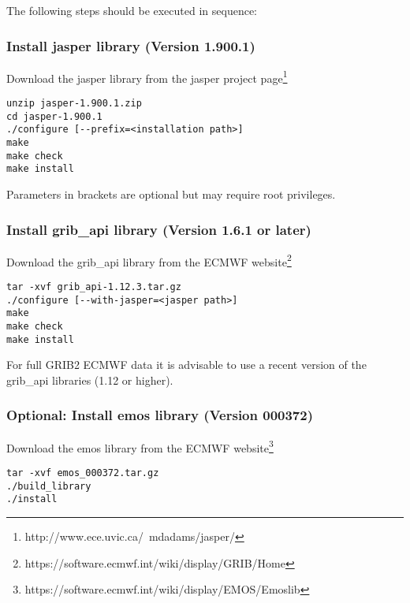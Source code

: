 \documentclass{egu}                  %
\begin{document}
\noindent The following steps should be executed in sequence:

\subsubsection{Install jasper library (Version 1.900.1)}

Download the jasper library from the jasper project page\footnote{http://www.ece.uvic.ca/~mdadams/jasper/} 

\begin{small}
\begin{verbatim}
unzip jasper-1.900.1.zip
cd jasper-1.900.1
./configure [--prefix=<installation path>]
make
make check
make install
\end{verbatim}
\end{small}

Parameters in brackets are optional but may require root privileges.  

\subsubsection{Install grib\_api library (Version 1.6.1 or later)}

Download the grib\_api library from the ECMWF
website\footnote{https://software.ecmwf.int/wiki/display/GRIB/Home}

\begin{small}
\begin{verbatim}
tar -xvf grib_api-1.12.3.tar.gz
./configure [--with-jasper=<jasper path>]
make
make check
make install
\end{verbatim}
\end{small}

For full GRIB2 ECMWF data it is advisable to use a recent version of the grib\_api libraries (1.12 or higher).

\subsubsection{Optional: Install emos library (Version 000372)}

Download the emos library from the ECMWF
website\footnote{https://software.ecmwf.int/wiki/display/EMOS/Emoslib}


\begin{small}
\begin{verbatim}
tar -xvf emos_000372.tar.gz
./build_library
./install
\end{verbatim}
\end{small}
\end{document}
